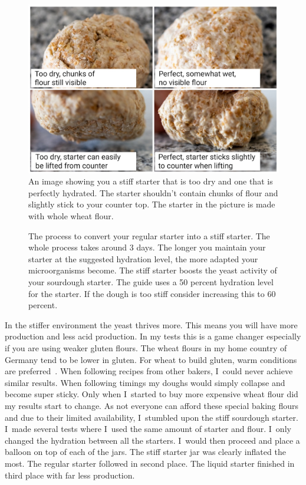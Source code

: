\begin{figure}[!htb]
  \includegraphics[width=\textwidth]{stiff-starter-dry-check.jpg}
  \caption{An image showing you a stiff starter that is too dry and one that is perfectly hydrated.
  The starter shouldn't contain chunks of flour and slightly stick to your counter top. The
  starter in the picture is made with whole wheat flour.}%
  \label{fig:stiff-starter-dry-check}
\end{figure}

\begin{figure}[!htb]
  
  \caption{The process to convert your regular starter into a stiff starter. The whole
  process takes around 3 days. The longer you maintain your starter at the
  suggested hydration level, the more adapted your microorganisms become. The
  stiff starter boosts the yeast activity of your sourdough starter.
  The guide uses a 50 percent hydration level for the starter. If the dough is too stiff
  consider increasing this to 60 percent.}%
  \label{fig:stiff-starter-conversion}
\end{figure}

In the stiffer environment the yeast thrives more. This means you will have
more  production and less acid production. In my tests this is a game
changer especially if you are using weaker gluten flours. The wheat flours in
my home country of Germany tend to be lower in gluten. For wheat to build gluten, warm conditions
are preferred~\cite{gluten+development+temperatures}. When following recipes
from other bakers, I~could never achieve similar results. When following
timings my doughs would
simply collapse and become super sticky. Only when I~started to buy more
expensive wheat flour did my results start to change. As not everyone can afford
these special baking flours and due to their limited availability, I~stumbled upon the
stiff sourdough starter. I~made several tests where I~used the same amount of
starter and flour. I~only changed the hydration between all the starters.
I~would then proceed and place a balloon on top of each of the jars. The stiff
starter jar was clearly inflated the most. The regular starter
followed in second place. The liquid starter finished in third place with far less 
production.

